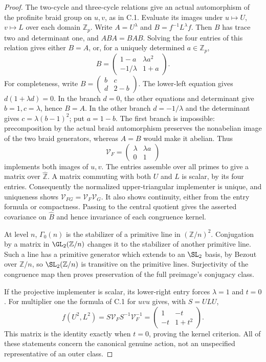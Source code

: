 \begin{proof}
The two-cycle and three-cycle relations give an actual automorphism
of the profinite braid group on $u,v$, as in C.1. Evaluate its
images under $u\mapsto U$, $v\mapsto L$ over each domain
$\mathbb Z_p$. Write $A=U^\lambda$ and $B=f^{-1}L^\lambda f$.
Then $B$ has trace two and determinant one, and $ABA=BAB$.
Solving the four entries of this relation gives either $B=A$,
or, for a uniquely determined $a\in\mathbb Z_p$,
\[
 B=\begin{pmatrix}1-a&\lambda a^2\\
                  -1/\lambda&1+a\end{pmatrix}.
\]
For completeness, write $B=\left(\begin{smallmatrix}b&c\\d&2-b\end{smallmatrix}\right)$.
The lower-left equation gives $d(1+\lambda d)=0$.
In the branch $d=0$, the other equations and determinant give
$b=1,c=\lambda$, hence $B=A$. In the other branch
$d=-1/\lambda$ and the determinant gives
$c=\lambda(b-1)^2$; put $a=1-b$.
The first branch is impossible: precomposition by the actual braid
automorphism preserves the nonabelian image of the two braid
generators, whereas $A=B$ would make it abelian. Thus
\[
 \mathcal V_F=\begin{pmatrix}\lambda&\lambda a\\0&1\end{pmatrix}
\]
implements both images of $u,v$. The entries assemble over all
primes to give a matrix over $\widehat{\mathbb Z}$. A matrix
commuting with both $U$ and $L$ is scalar, by its four entries.
Consequently the normalized upper-triangular implementer is unique,
and uniqueness shows $\mathcal V_{FG}=\mathcal V_F\mathcal V_G$.
It also shows continuity, either from the entry formula or compactness.
Passing to the central quotient gives the asserted covariance on
$\widehat B$ and hence invariance of each congruence kernel.

At level $n$, $\Gamma_0(n)$ is the stabilizer of a primitive line
in $(\mathbb Z/n)^2$. Conjugation by a matrix in $\GL_2(\mathbb Z/n)$
changes it to the stabilizer of another primitive line. Such a line
has a primitive generator which extends to an $\SL_2$ basis, by
Bezout over $\mathbb Z/n$, so $\SL_2(\mathbb Z/n)$ is transitive
on the primitive lines. Surjectivity of the congruence map then
proves preservation of the full preimage's conjugacy class.

If the projective implementer is scalar, its lower-right entry
forces $\lambda=1$ and $t=0$. For multiplier one the formula of
C.1 for $uvu$ gives, with $S=ULU$,
\[
 f(U^2,L^2)=S\mathcal V_F S^{-1}\mathcal V_F^{-1}
       =\begin{pmatrix}1&-t\\-t&1+t^2\end{pmatrix}.
\]
This matrix is the identity exactly when $t=0$, proving the kernel
criterion. All of these statements concern the canonical genuine
action, not an unspecified representative of an outer class.
\end{proof}


